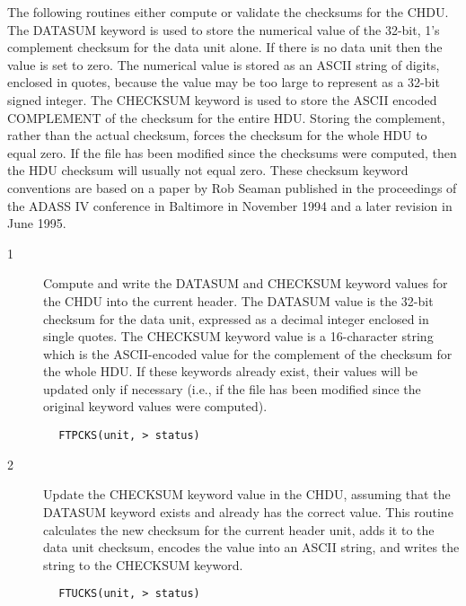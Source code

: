 \documentclass[11pt]{book}
\begin{document}
The following routines either compute or validate the checksums for the
CHDU.  The DATASUM keyword is used to store the numerical value of the
32-bit, 1's complement checksum for the data unit alone.  If there is
no data unit then the value is set to zero. The numerical value is
stored as an ASCII string of digits, enclosed in quotes, because the
value may be too large to represent as a 32-bit signed integer.  The
CHECKSUM keyword is used to store the ASCII encoded COMPLEMENT of the
checksum for the entire HDU.  Storing the complement, rather than the
actual checksum, forces the checksum for the whole HDU to equal zero.
If the file has been modified since the checksums were computed, then
the HDU checksum will usually not equal zero.  These checksum keyword
conventions are based on a paper by Rob Seaman published in the
proceedings of the ADASS IV conference in Baltimore in November 1994
and a later revision in June 1995.


\begin{description}
\item[1 ] Compute and write the DATASUM and CHECKSUM keyword values for the CHDU
    into the current header.  The DATASUM value is the 32-bit checksum
    for the data unit, expressed as a decimal integer enclosed in single
    quotes. The CHECKSUM keyword value is a 16-character string which
    is the ASCII-encoded value for the complement of the checksum for
    the whole HDU.  If these keywords already exist, their values
    will be updated only if necessary (i.e., if the file has been modified
   since the original keyword values were computed).
\end{description}

\begin{verbatim}
        FTPCKS(unit, > status)
\end{verbatim}

\begin{description}
\item[2 ] Update the CHECKSUM keyword value in the CHDU, assuming that the
    DATASUM keyword exists and already has the correct value.  This routine
    calculates the new checksum for the current header unit, adds it to the
    data unit checksum, encodes the value into an ASCII string, and writes
   the string to the CHECKSUM keyword.
\end{description}

\begin{verbatim}
        FTUCKS(unit, > status)
\end{verbatim}
\end{document}
